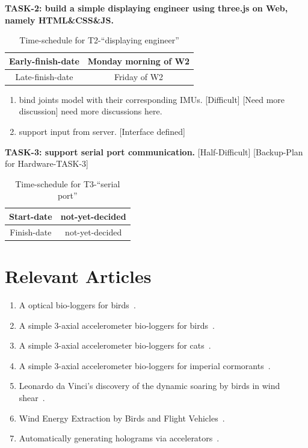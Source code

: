 \documentclass[11pt, a4paper]{article}
\begin{document}
\textbf{TASK-2: build a simple displaying engineer using three.js on Web, namely HTML\&CSS\&JS.}
\begin{table}[!ht]
	\centering
	\caption{Time-schedule for T2-``displaying engineer''}
	\begin{tabular}{|c|c|}
		\hline
		Early-finish-date & Monday morning of W2 \\ \hline
		Late-finish-date & Friday of W2 \\ \hline
	\end{tabular}
	\label{tab:SD_TASK_2}
\end{table}


\begin{enumerate}
	\item bind joints model with their corresponding IMUs. 	[Difficult]	[Need more discussion]
need more discussions here.
	\item support input from server.	[Interface defined]
\end{enumerate}

\textbf{TASK-3: support serial port communication.}  [Half-Difficult] [Backup-Plan for Hardware-TASK-3]
\begin{table}[!ht]
	\centering
	\caption{Time-schedule for T3-``serial port''}
	\begin{tabular}{|c|c|}
		\hline
		Start-date & not-yet-decided \\ \hline
		Finish-date & not-yet-decided \\ \hline
	\end{tabular}
	\label{tab:SD_TASK_3}
\end{table}


\newpage
\section{Relevant Articles}

\begin{enumerate}
	\item A optical bio-loggers for birds~\cite{ju_data-driven_2011}.
	\item A simple 3-axial accelerometer bio-loggers for birds~\cite{taylor_birds_2019}.
    \item A simple 3-axial accelerometer bio-loggers for cats~\cite{watanabe_new_2005}.
    \item A simple 3-axial accelerometer bio-loggers for imperial cormorants~\cite{gomez_laich_identification_2009}.
    \item Leonardo da Vinci’s discovery of the dynamic soaring by birds in wind shear~\cite{richardson_leonardo_2019}.
    \item Wind Energy Extraction by Birds and Flight Vehicles~\cite{lissaman_wind_2005}.
    \item Automatically generating holograms via accelerators~\cite{sakamoto_can_2009}.
\end{enumerate}









\newpage


\end{document}
